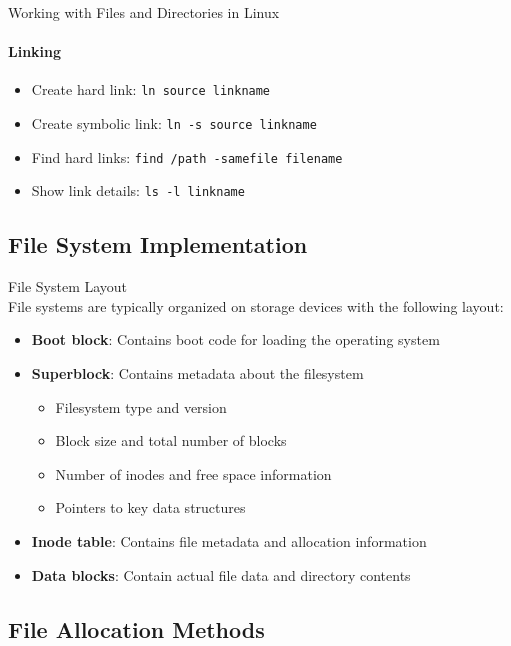 \begin{KR}{Working with Files and Directories in Linux}
    \paragraph{Linking}
    \begin{itemize}
        \item Create hard link: \texttt{ln source linkname}
        \item Create symbolic link: \texttt{ln -s source linkname}
        \item Find hard links: \texttt{find /path -samefile filename}
        \item Show link details: \texttt{ls -l linkname}
    \end{itemize}
\end{KR}

\subsection{File System Implementation}

\begin{definition}{File System Layout}\\
    File systems are typically organized on storage devices with the following layout:
    \begin{itemize}
        \item \textbf{Boot block}: Contains boot code for loading the operating system
        \item \textbf{Superblock}: Contains metadata about the filesystem
            \begin{itemize}
                \item Filesystem type and version
                \item Block size and total number of blocks
                \item Number of inodes and free space information
                \item Pointers to key data structures
            \end{itemize}
        \item \textbf{Inode table}: Contains file metadata and allocation information
        \item \textbf{Data blocks}: Contain actual file data and directory contents
    \end{itemize}
\end{definition}

\subsection{File Allocation Methods}

